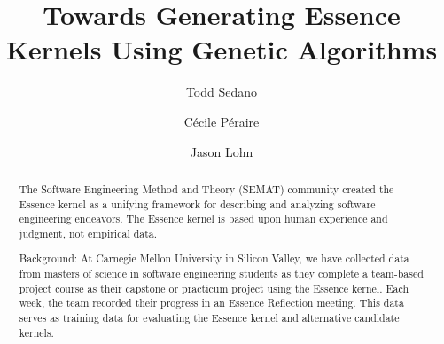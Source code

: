 \documentclass[3p,times,procedia]{elsarticle}
\begin{document}
\begin{frontmatter}




\title{Towards Generating Essence Kernels Using Genetic Algorithms}

\author{Todd Sedano}

\author{C\'ecile P\'eraire}

\author{Jason Lohn}


\address{Carnegie Mellon University}
\address{Silicon Valley Campus}
\address{Moffett Field, CA 94035, USA}


\begin{abstract}
The Software Engineering Method and Theory (SEMAT) community created the Essence kernel as a unifying framework for describing and analyzing software engineering endeavors. The Essence kernel is based upon human experience and judgment, not empirical data. 

Background: At Carnegie Mellon University in Silicon Valley, we have collected data from masters of science in software engineering students as they complete a team-based project course as their capstone or practicum project using the Essence kernel. Each week, the team recorded their progress in an Essence Reflection meeting. This data serves as training data for evaluating the Essence kernel and alternative candidate kernels.


\end{abstract}
\end{frontmatter}
\end{document}
